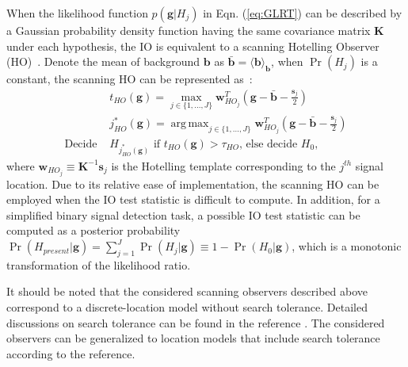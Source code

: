 \documentclass[journal]{IEEEtran}
\renewcommand{\vec}[1]{\mathbf{#1}}
\DeclareMathOperator*{\argmax}{arg\,max}
\begin{document}
When the likelihood function $p(\vec{g}|H_j)$ in Eqn. (\ref{eq:GLRT}) can be described by a Gaussian probability density function having the same covariance matrix $\bm{\vec{K}}$ under each hypothesis,
the IO is equivalent to a scanning Hotelling Observer (HO)~\cite{barrett2006objective, gifford2014efficient, gifford2016visual}. 
{Denote the mean of background $\vec{b}$ as $\bar{\vec{b}} = \langle \vec{b} \rangle_{\vec{b}}$, when $\Pr(H_j)$ is a constant, the scanning HO can be represented as~\cite{barrett2006objective, gifford2014efficient, gifford2016visual}:}
\begin{equation}\label{eq:sho}
\begin{split}
&{t_{HO}(\mathbf{g}) =  \max_{j\in\{1,...,J\}} \vec{w}_{HO_j}^T \left(\vec{g} - \bar{\vec{b}} - \frac{\vec{s}_j}{2}\right)}\\
&{j_{HO}^*(\mathbf{g}) =\argmax_{j\in\{1,...,J\}}\vec{w}_{HO_j}^T \left(\vec{g} - \bar{\vec{b}} - \frac{\vec{s}_j}{2}\right)}\\
\text{Decide }&{\text{$H_{j_{HO}^*(\mathbf{g})}$ if $t_{HO}(\mathbf{g}) > \tau_{HO}$, else decide $H_0$},}
\end{split}
\end{equation}
where $\vec{w}_{HO_j} \equiv \bm{\vec{K}}^{-1}\vec{s}_j$ is the Hotelling
 template corresponding to the $j^{th}$ signal location. 
Due to its relative ease of implementation, the scanning HO can be employed when the IO test statistic is difficult to compute. 
In addition, for a simplified binary signal detection task, 
{a possible IO test statistic can be computed as a posterior probability $\Pr(H_{present}|\vec{g})= \sum_{j=1}^{J}{\Pr(H_j|\mathbf{g})}\equiv 1 - \Pr(H_0|\mathbf{g})$, which is a monotonic transformation of the likelihood ratio.}

{It should be noted that the considered scanning observers described above 
correspond to a discrete-location model without search tolerance.
Detailed discussions on search tolerance can be found in the reference \cite{khurd2005decision}.
The considered observers can be generalized to location models that include search tolerance according to the reference\cite{khurd2005decision}.}

\vspace{0.3cm}
\end{document}
